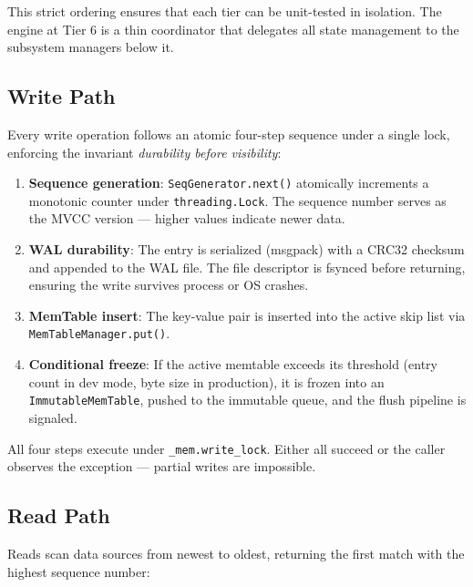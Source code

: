 \documentclass[conference]{IEEEtran}
\begin{document}
This strict ordering ensures that each tier can be unit-tested in isolation. The engine at Tier 6 is a thin coordinator that delegates all state management to the subsystem managers below it.

\subsection{Write Path}

Every write operation follows an atomic four-step sequence under a single lock, enforcing the invariant \textit{durability before visibility}:

\begin{enumerate}[leftmargin=*]
    \item \textbf{Sequence generation}: \texttt{SeqGenerator.next()} atomically increments a monotonic counter under \texttt{threading.Lock}. The sequence number serves as the MVCC version --- higher values indicate newer data.

    \item \textbf{WAL durability}: The entry is serialized (msgpack) with a CRC32 checksum and appended to the WAL file. The file descriptor is fsynced before returning, ensuring the write survives process or OS crashes.

    \item \textbf{MemTable insert}: The key-value pair is inserted into the active skip list via \texttt{MemTableManager.put()}.

    \item \textbf{Conditional freeze}: If the active memtable exceeds its threshold (entry count in dev mode, byte size in production), it is frozen into an \texttt{ImmutableMemTable}, pushed to the immutable queue, and the flush pipeline is signaled.
\end{enumerate}

All four steps execute under \texttt{\_mem.write\_lock}. Either all succeed or the caller observes the exception --- partial writes are impossible.

\subsection{Read Path}

Reads scan data sources from newest to oldest, returning the first match with the highest sequence number:
\end{document}
